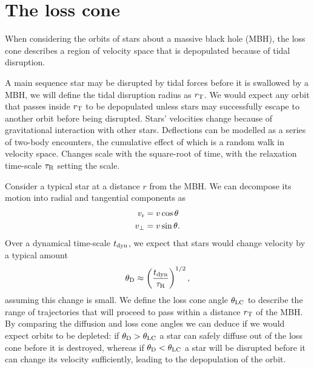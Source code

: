 \chapter{The loss cone}

When considering the orbits of stars about a massive black hole (MBH), the loss cone describes a region of velocity space that is depopulated because of tidal disruption.

A main sequence star may be disrupted by tidal forces before it is swallowed by a MBH, we will define the tidal disruption radius as $r_\mathrm{T}$. We would expect any orbit that passes inside $r_\mathrm{T}$ to be depopulated unless stars may successfully escape to another orbit before being disrupted. Stars' velocities change because of gravitational interaction with other stars. Deflections can be modelled as a series of two-body encounters, the cumulative effect of which is a random walk in velocity space. Changes scale with the square-root of time, with the relaxation time-scale $\tau_\mathrm{R}$ setting the scale.

Consider a typical star at a distance $r$ from the MBH. We can decompose its motion into radial and tangential components as
\begin{subequations}
\begin{align}
v_\mathrm{r} = {} & v\cos \theta \\
v_\perp = {} & v\sin \theta.
\end{align}
\end{subequations}
Over a dynamical time-scale $t_\mathrm{dyn}$, we expect that stars would change velocity by a typical amount
\begin{equation}
\theta_\mathrm{D} \approx \left(\frac{t_\mathrm{dyn}}{\tau_\mathrm{R}}\right)^{1/2},
\end{equation}
assuming this change is small. We define the loss cone angle $\theta_\mathrm{LC}$ to describe the range of trajectories that will proceed to pass within a distance $r_\mathrm{T}$ of the MBH. By comparing the diffusion and loss cone angles we can deduce if we would expect orbits to be depleted: if $\theta_\mathrm{D} > \theta_\mathrm{LC}$ a star can safely diffuse out of the loss cone before it is destroyed, whereas if $\theta_\mathrm{D} < \theta_\mathrm{LC}$ a star will be disrupted before it can change its velocity sufficiently, leading to the depopulation of the orbit.

